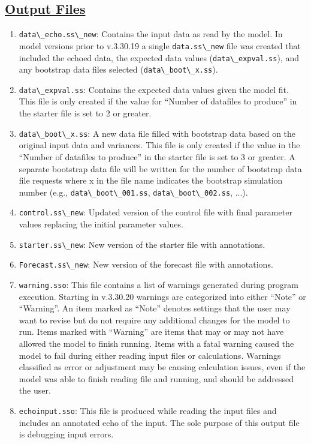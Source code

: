 \subsection[Output Files]{\protect\hyperlink{OutputFilesList}{Output Files}}
\begin{enumerate}
	\item \verb|data\_echo.ss\_new|: Contains the input data as read by the model. In model versions prior to v.3.30.19 a single \verb|data.ss\_new| file was created that included the echoed data, the expected data values (\verb|data\_expval.ss|), and any bootstrap data files selected (\verb|data\_boot\_x.ss|).
	\item \verb|data\_expval.ss|: Contains the expected data values given the model fit. This file is only created if the value for ``Number of datafiles to produce'' in the starter file is set to 2 or greater.
	\item \verb|data\_boot\_x.ss|: A new data file filled with bootstrap data based on the original input data and variances. This file is only created if the value in the ``Number of datafiles to produce'' in the starter file is set to 3 or greater. A separate bootstrap data file will be written for the number of bootstrap data file requests where x in the file name indicates the bootstrap simulation number (e.g., \verb|data\_boot\_001.ss|, \verb|data\_boot\_002.ss|, ...).
	\item \verb|control.ss\_new|: Updated version of the control file with final parameter values replacing the initial parameter values.
	\item \verb|starter.ss\_new|: New version of the starter file with annotations.
	\item \verb|Forecast.ss\_new|: New version of the forecast file with annotations.
	\item \verb|warning.sso|: This file contains a list of warnings generated during program execution. Starting in v.3.30.20 warnings are categorized into either ``Note'' or ``Warning''. An item marked as ``Note'' denotes settings that the user may want to revise but do not require any additional changes for the model to run. Items marked with ``Warning'' are items that may or may not have allowed the model to finish running. Items with a fatal warning caused the model to fail during either reading input files or calculations. Warnings classified as error or adjustment may be causing calculation issues, even if the model was able to finish reading file and running, and should be addressed the user. 
	\item \verb|echoinput.sso|: This file is produced while reading the input files and includes an annotated echo of the input. The sole purpose of this output file is debugging input errors.

\end{enumerate}
